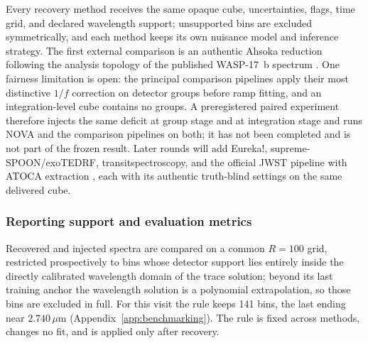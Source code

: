 Every recovery method receives the same opaque cube, uncertainties, flags,
time grid, and declared wavelength support; unsupported bins are excluded
symmetrically, and each method keeps its own nuisance model and inference
strategy. The first external comparison is an authentic Ahsoka reduction
following the analysis topology of the published WASP-17~b spectrum
\citep{LouieEtAl2025}. One fairness limitation is open: the principal
comparison pipelines apply their most distinctive $1/f$ correction on
detector groups before ramp fitting, and an integration-level cube
contains no groups. A preregistered paired experiment therefore injects
the same deficit at group stage and at integration stage and runs NOVA and
the comparison pipelines on both; it has not been completed and is not
part of the frozen result. Later rounds will add Eureka!,
supreme-SPOON/exoTEDRF, transitspectroscopy, and the official JWST
pipeline with ATOCA extraction
\citep{BellEtAl2022,Radica2024,Espinoza2022TransitSpectroscopy,%
JWSTPipeline2025,DarveauBernierEtAl2022,LouieEtAl2025}, each with its
authentic truth-blind settings on the same delivered cube.

\subsubsection{Reporting support and evaluation metrics}


Recovered and injected spectra are compared on a common $R=100$ grid,
restricted prospectively to bins whose detector support lies entirely
inside the directly calibrated wavelength domain of the trace solution;
beyond its last training anchor the wavelength solution is a polynomial
extrapolation, so those bins are excluded in full. For this visit the
rule keeps 141 bins, the last ending near $2.740\,\mu\mathrm{m}$
(Appendix~\ref{app:benchmarking}). The rule is fixed across methods,
changes no fit, and is applied only after recovery.

